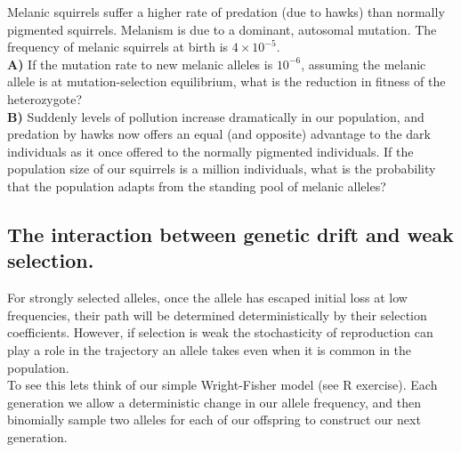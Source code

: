\begin{tcolorbox} 
\begin{question}
Melanic squirrels suffer a higher rate of predation (due to hawks) than normally pigmented squirrels. Melanism is due to a dominant, autosomal mutation. The frequency of melanic squirrels at birth is $4 \times 10^{-5}$.\\

{\bf A)} If the mutation rate to new melanic alleles is $10^{-6}$, assuming the melanic allele is at mutation-selection equilibrium, what is the reduction in fitness of the heterozygote? \\ 
{\bf B)} Suddenly levels of pollution increase dramatically in our population, and predation by hawks now offers an equal (and opposite) advantage to the dark individuals as it once offered to the normally pigmented individuals. If the population size of our squirrels is a million individuals, what is the probability that the population adapts from the standing pool of melanic alleles?  
\end{question}
\end{tcolorbox}

\subsection{The interaction between genetic drift and weak selection.}
For strongly selected alleles, once the allele has escaped initial
loss at low frequencies, their path will be determined deterministically by their
selection coefficients. However, if selection is weak the
stochasticity of reproduction can play a role in the trajectory an
allele takes even when it is common in the population.\\

To see this lets think of our simple Wright-Fisher model (see R
exercise). Each generation we allow a deterministic change in our
allele frequency, and then binomially sample two alleles for each of
our offspring to construct our next generation.\\



